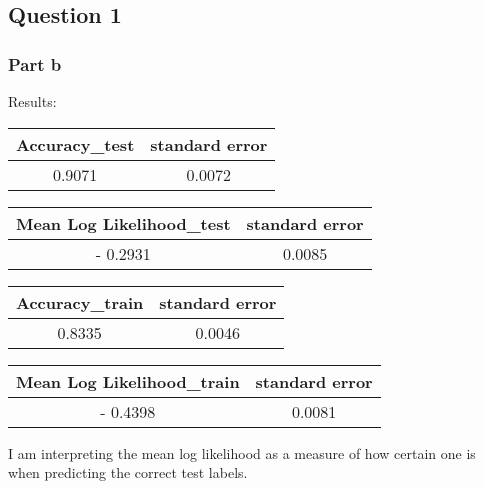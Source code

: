 \documentclass[11pt]{article}
\begin{document}





\subsection{Question 1}

\subsubsection{Part b}
Results:

\begin{center}
\begin{tabular}{|c|c|}
\hline
Accuracy\_test & standard error \\
 \hline
0.9071 & 0.0072 \\
\hline
\end{tabular}
\begin{tabular}{|c|c|}
\hline
Mean Log Likelihood\_test & standard error \\
 \hline
- 0.2931 & 0.0085 \\
\hline
\end{tabular}
\end{center}





\begin{center}
\begin{tabular}{|c|c|}
\hline
Accuracy\_train & standard error \\
 \hline
0.8335 & 0.0046 \\
\hline
\end{tabular}
\begin{tabular}{|c|c|}
\hline
Mean Log Likelihood\_train & standard error \\
 \hline
- 0.4398 & 0.0081 \\
\hline
\end{tabular}
\end{center}
I am interpreting the mean log likelihood  as a measure of how certain one is when predicting the correct test labels. 
\end{document}
